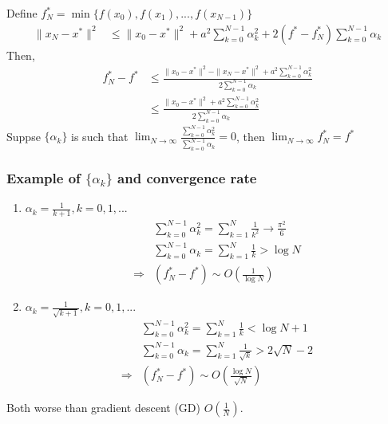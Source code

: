 \documentclass[11pt,a4paper]{article}
\begin{document}
Define $f_N^*=\min\{f(x_0),f(x_1),...,f(x_{N-1})\}$
\begin{equation}
    \begin{aligned}
        \|x_{N}-x^*\|^2&\leq \|x_{0}-x^*\|^2+a^2\sum_{k=0}^{N-1}\alpha_{k}^2+2(f^*-f_N^*)\sum_{k=0}^{N-1}\alpha_k
    \end{aligned}
    \nonumber
\end{equation}
Then,
\begin{equation}
    \begin{aligned}
        f_N^*-f^*&\leq \frac{\|x_0-x^*\|^2-\|x_{N}-x^*\|^2+a^2\sum_{k=0}^{N-1}\alpha_k^2}{2\sum_{k=0}^{N-1}\alpha_k}\\
        &\leq \frac{\|x_0-x^*\|^2+a^2\sum_{k=0}^{N-1}\alpha_k^2}{2\sum_{k=0}^{N-1}\alpha_k}
    \end{aligned}
    \nonumber
\end{equation}
Suppse $\{\alpha_k\}$ is such that $\lim_{N \rightarrow	\infty}\frac{\sum_{k=0}^{N-1}\alpha_k^2}{\sum_{k=0}^{N-1}\alpha_k}=0$, then $\lim_{N \rightarrow \infty} f_N^*=f^*$

\subsubsection*{Example of $\{\alpha_k\}$ and convergence rate}
\begin{enumerate}[1)]
    \item $\alpha_k=\frac{1}{k+1},k=0,1,...$
    \begin{equation}
        \begin{aligned}
            &\sum_{k=0}^{N-1}\alpha_k^2=\sum_{k=1}^{N}\frac{1}{k^2}\rightarrow \frac{\pi^2}{6}\\
            &\sum_{k=0}^{N-1}\alpha_k=\sum_{k=1}^{N}\frac{1}{k}>\log N\\
            \Rightarrow&(f^*_N-f^*)\sim O(\frac{1}{\log N})
        \end{aligned}
        \nonumber
    \end{equation}
    \item $\alpha_k=\frac{1}{\sqrt{k+1}},k=0,1,...$
    \begin{equation}
        \begin{aligned}
            &\sum_{k=0}^{N-1}\alpha_k^2=\sum_{k=1}^{N}\frac{1}{k}<\log N+1\\
            &\sum_{k=0}^{N-1}\alpha_k=\sum_{k=1}^{N}\frac{1}{\sqrt{k}}>2\sqrt{N}-2\\
            \Rightarrow&(f^*_N-f^*)\sim O(\frac{\log N}{\sqrt{N}})
        \end{aligned}
        \nonumber
    \end{equation}
\end{enumerate}
Both worse than gradient descent (GD) $O(\frac{1}{N})$.
\end{document}
